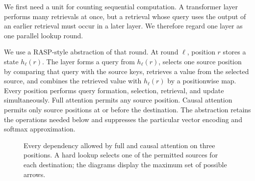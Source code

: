 \documentclass[11pt,twoside]{article}
\theoremstyle{definition}
\theoremstyle{remark}
\begin{document}
We first need a unit for counting sequential computation. A transformer layer
performs many retrievals at once, but a retrieval whose query uses the output
of an earlier retrieval must occur in a later layer. We therefore regard one
layer as one parallel lookup round.

We use a RASP-style abstraction of that round. At round $\ell$, position $r$
stores a state $h_\ell(r)$. The layer forms a query from
$h_\ell(r)$, selects one source position by comparing that query with the
source keys, retrieves a value from the selected source, and combines the
retrieved value with $h_\ell(r)$ by a positionwise map. Every position performs
query formation, selection, retrieval, and update simultaneously. Full
attention permits any source position.
Causal attention permits only source positions at or before the destination.
The abstraction retains the operations needed below and suppresses the
particular vector encoding and softmax approximation.

\begin{figure}[ht]
\centering
{}
\caption{Every dependency allowed by full and causal attention on three
positions. A hard lookup selects one of the permitted sources for each
destination; the diagrams display the maximum set of possible arrows.}
\label{fig:attention-dependencies}
\end{figure}
\end{document}
